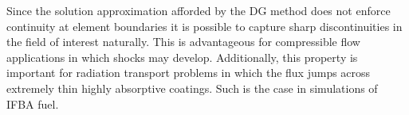 Since the solution approximation afforded by the DG method does not enforce continuity at
element boundaries it is possible to capture sharp discontinuities in the field
of interest naturally.  This is advantageous for compressible flow applications in which
shocks may develop.  Additionally, this property is important for radiation transport problems
in which the flux jumps across extremely thin highly absorptive coatings.
Such is the case in simulations of IFBA fuel.
